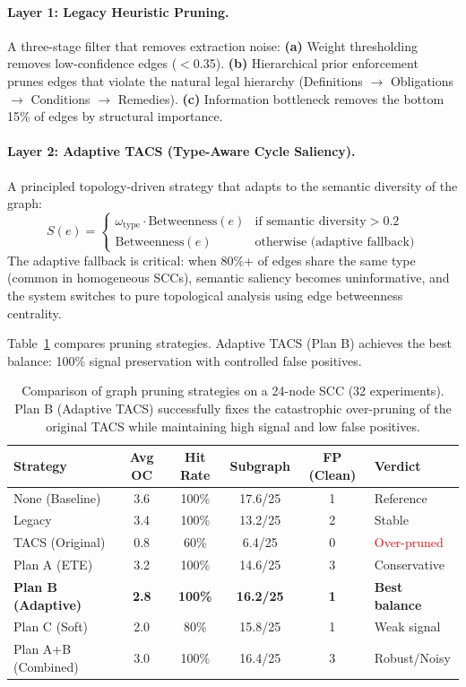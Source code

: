 \documentclass{article}
\begin{document}
\paragraph{Layer 1: Legacy Heuristic Pruning.} A three-stage filter that removes extraction noise:
\textbf{(a)} Weight thresholding removes low-confidence edges ($<$0.35).
\textbf{(b)} Hierarchical prior enforcement prunes edges that violate the natural legal hierarchy (Definitions $\to$ Obligations $\to$ Conditions $\to$ Remedies).
\textbf{(c)} Information bottleneck removes the bottom 15\% of edges by structural importance.

\paragraph{Layer 2: Adaptive TACS (Type-Aware Cycle Saliency).} A principled topology-driven strategy that adapts to the semantic diversity of the graph:
\begin{equation}
S(e) = \begin{cases}
    \omega_{\text{type}} \cdot \text{Betweenness}(e) & \text{if semantic diversity} > 0.2 \\
    \text{Betweenness}(e) & \text{otherwise (adaptive fallback)}
\end{cases}
\end{equation}
The adaptive fallback is critical: when 80\%+ of edges share the same type (common in homogeneous SCCs), semantic saliency becomes uninformative, and the system switches to pure topological analysis using edge betweenness centrality.

Table~\ref{tab:pruning} compares pruning strategies. Adaptive TACS (Plan B) achieves the best balance: 100\% signal preservation with controlled false positives.

\begin{table}[t]
\caption{Comparison of graph pruning strategies on a 24-node SCC (32 experiments). Plan B (Adaptive TACS) successfully fixes the catastrophic over-pruning of the original TACS while maintaining high signal and low false positives.}
\label{tab:pruning}
\centering
\small
\begin{tabular}{lccccl}
\toprule
\textbf{Strategy} & \textbf{Avg OC} & \textbf{Hit Rate} & \textbf{Subgraph} & \textbf{FP (Clean)} & \textbf{Verdict} \\
\midrule
None (Baseline) & 3.6 & 100\% & 17.6/25 & 1 & Reference \\
Legacy & 3.4 & 100\% & 13.2/25 & 2 & Stable \\
TACS (Original) & 0.8 & 60\% & 6.4/25 & 0 & \textcolor{red}{Over-pruned} \\
Plan A (ETE) & 3.2 & 100\% & 14.6/25 & 3 & Conservative \\
\rowcolor{lightgray}
\textbf{Plan B (Adaptive)} & \textbf{2.8} & \textbf{100\%} & \textbf{16.2/25} & \textbf{1} & \textbf{Best balance} \\
Plan C (Soft) & 2.0 & 80\% & 15.8/25 & 1 & Weak signal \\
Plan A+B (Combined) & 3.0 & 100\% & 16.4/25 & 3 & Robust/Noisy \\
\bottomrule
\end{tabular}
\end{table}
\end{document}
